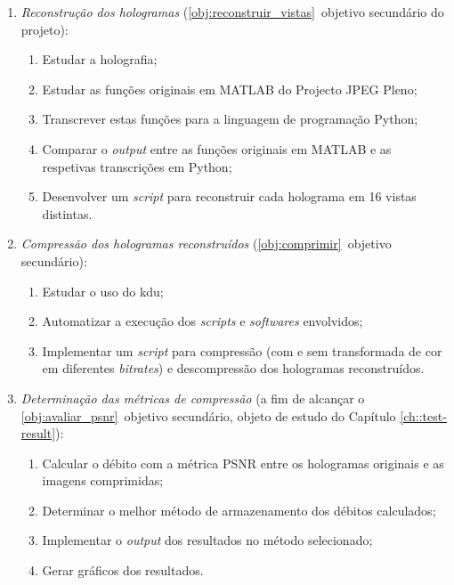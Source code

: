 \begin{enumerate}
    \item \textit{Reconstrução dos hologramas} (\ref{obj:reconstruir_vistas}\textordmasculine~objetivo secundário do projeto):
    \begin{enumerate}
        \item Estudar a holografia;
        \item Estudar as funções originais em MATLAB do Projecto JPEG Pleno;
        \item Transcrever estas funções para a linguagem de programação Python;
        \item Comparar o \textit{output} entre as funções originais em MATLAB e as respetivas transcrições em Python;
        \item Desenvolver um \textit{script} para reconstruir cada holograma em 16 vistas distintas.
    \end{enumerate}

    \item \textit{Compressão dos hologramas reconstruídos} (\ref{obj:comprimir}\textordmasculine~objetivo secundário):
    \begin{enumerate}
        \item Estudar o uso do \ac{kdu};
        \item Automatizar a execução dos \textit{scripts} e \textit{softwares} envolvidos;
        \item Implementar um \textit{script} para compressão (com e sem transformada de cor em diferentes \textit{bitrates}) e descompressão dos hologramas reconstruídos.
    \end{enumerate}

    \item \textit{Determinação das métricas de compressão} (a fim de alcançar o \ref{obj:avaliar_psnr}\textordmasculine~objetivo secundário, objeto de estudo do Capítulo \ref{ch::test-result}):
    \begin{enumerate}
        \item Calcular o débito com a métrica \ac{PSNR} entre os hologramas originais e as imagens comprimidas;
        \item Determinar o melhor método de armazenamento dos débitos calculados;
        \item Implementar o \textit{output} dos resultados no método selecionado;
        \item Gerar gráficos dos resultados.
    \end{enumerate}
\end{enumerate}


